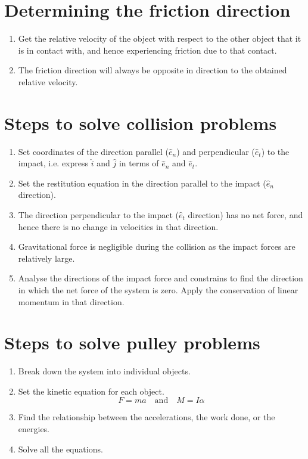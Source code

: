 \documentclass[11pt]{article}
\begin{document}
\section{Determining the friction direction}
\label{sec:org4ab8fd9}
\begin{enumerate}
\item Get the relative velocity of the object with respect to the other object that it is in contact with, and hence experiencing friction due to that contact.
\item The friction direction will always be opposite in direction to the obtained relative velocity.
\end{enumerate}

\section{Steps to solve collision problems}
\label{sec:org2ad52e2}
\begin{enumerate}
\item Set coordinates of the direction parallel (\(\hat{e}_n\)) and perpendicular (\(\hat{e}_t\)) to the impact, i.e. express \(\hat{i}\) and \(\hat{j}\) in terms of \(\hat{e}_n\) and \(\hat{e}_t\).
\item Set the restitution equation in the direction parallel to the impact (\(\hat{e}_n\) direction).
\item The direction perpendicular to the impact (\(\hat{e}_t\) direction) has no net force, and hence there is no change in velocities in that direction.
\item Gravitational force is negligible during the collision as the impact forces are relatively large.
\item Analyse the directions of the impact force and constrains to find the direction in which the net force of the system is zero. Apply the conservation of linear momentum in that direction.
\end{enumerate}

\section{Steps to solve pulley problems}
\label{sec:org0a04034}
\begin{enumerate}
\item Break down the system into individual objects.
\item Set the kinetic equation for each object.
\[F = ma \quad \text{and} \quad M = I \alpha\]
\item Find the relationship between the accelerations, the work done, or the energies.
\item Solve all the equations.
\end{enumerate}
\end{document}
